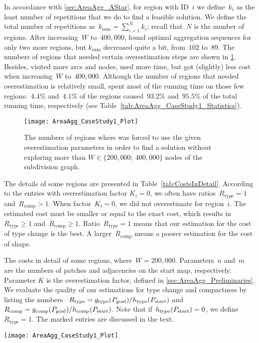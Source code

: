 In accordance with \sect\ref{sec:AreaAgg_AStar}, 
for region with ID~$i$ 
we define~$k_i$ as the least number of repetitions 
that we do to find a feasible solution. 
We define the total number of repetitions 
as~$k_\mathrm{sum}=\sum_{i=1}^N k_i$; 
recall that~$N$ is the number of regions.
After increasing~$W$ to~$400{,}000$, 
\Astar found optimal aggregation sequences 
for only two more regions, 
but $k_\mathrm{sum}$ decreased quite a bit, 
from~$102$ to~$89$. 
The numbers of regions that needed certain
overestimation steps are shown in 
\fig\ref{fig:AreaAgg_OverStats}. 
Besides, \Astar visited more arcs and nodes, 
used more time, 
but got (slightly) less cost when increasing~$W$ to~$400{,}000$.
Although the number of regions 
that needed overestimation is relatively small, 
\Astar spent most of the running time 
on those few regions:~$4.4\%$ and~$4.1\%$ of the regions 
caused~$93.2\%$ and~$95.5\%$ of the total running time, 
respectively 
(see Table~\ref{tab:AreaAgg_CaseStudy1_Statistics}).

\begin{figure}[tb]
\centering
\texttt{[image: AreaAgg\_CaseStudy1\_Plot]}
\caption{The numbers of regions where \Astar was 
	forced to use the given overestimation parameters
	in order to find a solution 
	without exploring more than 
	$W \in \{200{,}000;~400{,}000\}$ 
	nodes of the subdivision graph.}
\label{fig:AreaAgg_OverStats}
\end{figure}

The details of some regions are presented in 
Table~\ref{tab:CostsInDetail}.
According to the entries with overestimation factor $K_i=0$, 
we often have 
ratios~$R_\mathrm{type}=1$ and~$R_\mathrm{comp}>1$.
When factor~$K_i=0$, we did not overestimate for region~$i$.
The estimated cost must be smaller or equal to the exact cost,
which results in~$R_\mathrm{type}\ge 1$ 
and~$R_\mathrm{comp}\ge 1$.
Ratio~$R_\mathrm{type} = 1$ means that our estimation for the 
cost of type change is the best.
A larger~$R_\mathrm{comp}$ means 
a poorer estimation for the cost of shape.

\begin{table*}[tb]
\caption{The costs in detail of some regions, 
	where~$W=200{,}000$.  
	Parameters~$n$ and~$m$ are the numbers of patches and 
	adjacencies on the start map, respectively.
	Parameter $K$ is the overestimation factor, 
	defined in \sect\ref{sec:AreaAgg_Preliminaries}. 
	We evaluate the quality 
	of our estimations for type change and 
	compactness by listing the numbers~
	$R_\mathrm{type}=g_\mathrm{type}(P_\mathrm{goal})
	/h_\mathrm{type}(P_\mathrm{start})$ and~
	$R_\mathrm{comp}=g_\mathrm{comp}(P_\mathrm{goal})
	/h_\mathrm{comp}(P_\mathrm{start})$. 
	Note that if~$h_\mathrm{type}(P_\mathrm{start})=0$, 
	we define~$R_\mathrm{type}=1$.
	The marked entries are discussed in the text.
}
\label{tab:CostsInDetail}
\centering
\texttt{[image: AreaAgg\_CaseStudy1\_Plot]}
\end{table*}


